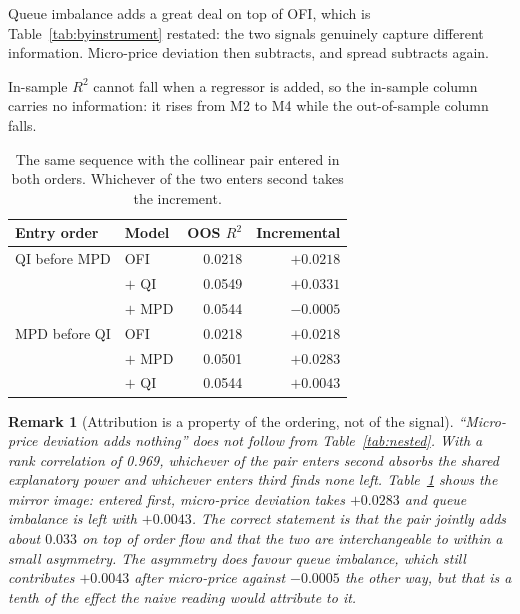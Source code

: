 \documentclass[11pt]{scrartcl}
\newtheorem{remark}{Remark}[section]
\begin{document}
Queue imbalance adds a great deal on top of OFI, which is Table~\ref{tab:byinstrument} restated: the two signals genuinely capture different information. Micro-price deviation then subtracts, and spread subtracts again.

In-sample $R^2$ cannot fall when a regressor is added, so the in-sample column carries no information: it rises from M2 to M4 while the out-of-sample column falls.

\begin{table}[H]
\centering
\caption{The same sequence with the collinear pair entered in both orders. Whichever of the two enters second takes the increment.}
\label{tab:order}
\begin{tabular}{llrr}
\toprule
Entry order & Model & OOS $R^2$ & Incremental \\
\midrule
QI before MPD & OFI                & 0.0218 & $+0.0218$ \\
              & $+$ QI             & 0.0549 & $+0.0331$ \\
              & $+$ MPD            & 0.0544 & $-0.0005$ \\
\midrule
MPD before QI & OFI                & 0.0218 & $+0.0218$ \\
              & $+$ MPD            & 0.0501 & $+0.0283$ \\
              & $+$ QI             & 0.0544 & $+0.0043$ \\
\bottomrule
\end{tabular}
\end{table}

\begin{remark}[Attribution is a property of the ordering, not of the signal]
\label{rem:order}
``Micro-price deviation adds nothing'' does not follow from Table~\ref{tab:nested}. With a rank correlation of 0.969, whichever of the pair enters second absorbs the shared explanatory power and whichever enters third finds none left. Table~\ref{tab:order} shows the mirror image: entered first, micro-price deviation takes $+0.0283$ and queue imbalance is left with $+0.0043$. The correct statement is that the pair jointly adds about $0.033$ on top of order flow and that the two are interchangeable to within a small asymmetry. The asymmetry does favour queue imbalance, which still contributes $+0.0043$ after micro-price against $-0.0005$ the other way, but that is a tenth of the effect the naive reading would attribute to it.
\end{remark}
\end{document}
